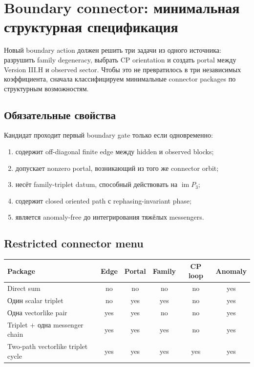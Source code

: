 \chapter{Boundary connector: минимальная структурная спецификация}

Новый boundary action должен решить три задачи из одного источника:
разрушить family degeneracy, выбрать CP orientation и создать portal между
Version III.H и observed sector. Чтобы это не превратилось в три независимых
коэффициента, сначала классифицируем минимальные connector packages по
структурным возможностям.

\section{Обязательные свойства}

Кандидат проходит первый boundary gate только если одновременно:
\begin{enumerate}
\item содержит off-diagonal finite edge между hidden и observed blocks;
\item допускает nonzero portal, возникающий из того же connector orbit;
\item несёт family-triplet datum, способный действовать на
\(\operatorname{im}P_3\);
\item содержит closed oriented path с rephasing-invariant phase;
\item является anomaly-free до интегрирования тяжёлых messengers.
\end{enumerate}

\section{Restricted connector menu}

\begin{center}
\small
\begin{tabular}{>{\raggedright\arraybackslash}p{}ccccc}
\toprule
Package & Edge & Portal & Family & CP loop & Anomaly \\
\midrule
Direct sum & no & no & no & no & yes \\
Один scalar triplet & no & yes & yes & no & yes \\
Одна vectorlike pair & yes & yes & no & no & yes \\
Triplet + одна messenger chain & yes & yes & yes & no & yes \\
Two-path vectorlike triplet cycle & yes & yes & yes & yes & yes \\
\bottomrule
\end{tabular}
\end{center}

